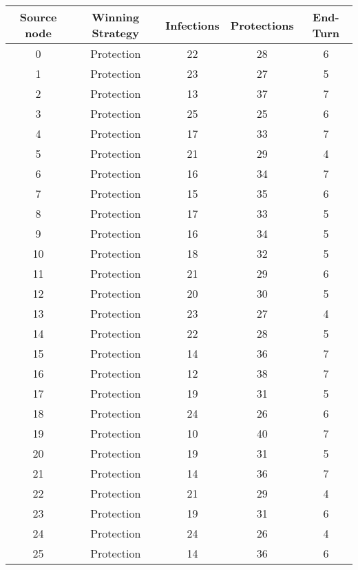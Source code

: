\documentclass[results.tex]{subfiles}
\begin{document}
\begin{center}
  \begin{tabular}{| c || c | c | c | c |}
    \hline
    {\bfseries Source node} & {\bfseries Winning Strategy} & {\bfseries Infections} & {\bfseries Protections} & {\bfseries End-Turn} \\  %
    \hline\hline
    0 & Protection & 22 & 28 & 6 \\ 
    \hline
    1 & Protection & 23 & 27 & 5 \\ 
    \hline
    2 & Protection & 13 & 37 & 7 \\ 
    \hline
    3 & Protection & 25 & 25 & 6 \\ 
    \hline
    4 & Protection & 17 & 33 & 7 \\ 
    \hline
    5 & Protection & 21 & 29 & 4 \\ 
    \hline
    6 & Protection & 16 & 34 & 7 \\ 
    \hline
    7 & Protection & 15 & 35 & 6 \\ 
    \hline
    8 & Protection & 17 & 33 & 5 \\ 
    \hline
    9 & Protection & 16 & 34 & 5 \\ 
    \hline
    10 & Protection & 18 & 32 & 5 \\ 
    \hline
    11 & Protection & 21 & 29 & 6 \\ 
    \hline
    12 & Protection & 20 & 30 & 5 \\ 
    \hline
    13 & Protection & 23 & 27 & 4 \\ 
    \hline
    14 & Protection & 22 & 28 & 5 \\ 
    \hline
    15 & Protection & 14 & 36 & 7 \\ 
    \hline
    16 & Protection & 12 & 38 & 7 \\ 
    \hline
    17 & Protection & 19 & 31 & 5 \\ 
    \hline
    18 & Protection & 24 & 26 & 6 \\ 
    \hline
    19 & Protection & 10 & 40 & 7 \\ 
    \hline
    20 & Protection & 19 & 31 & 5 \\ 
    \hline
    21 & Protection & 14 & 36 & 7 \\ 
    \hline
    22 & Protection & 21 & 29 & 4 \\ 
    \hline
    23 & Protection & 19 & 31 & 6 \\ 
    \hline
    24 & Protection & 24 & 26 & 4 \\ 
    \hline
    25 & Protection & 14 & 36 & 6 \\ 

\end{tabular}
\end{center}
\end{document}
